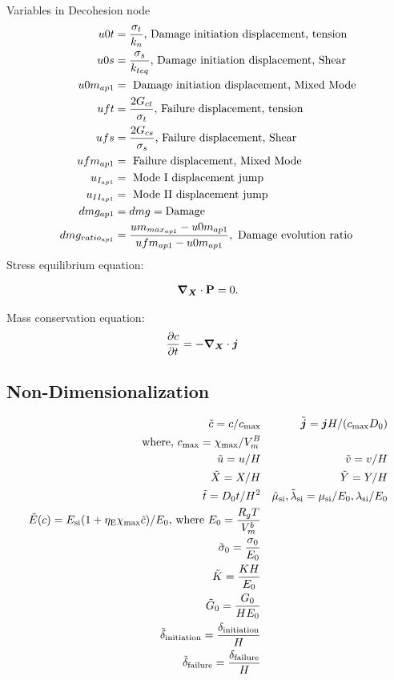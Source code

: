 \documentclass[../main.tex]{subfiles}
\begin{document}
Variables in Decohesion node
\begin{align}
    u0t &= \frac{\sigma_t}{k_n} \text{, Damage initiation displacement, tension} \\
    u0s &= \frac{\sigma_s}{k_{teq}} \text{, Damage initiation displacement, Shear}\\
    u0m_{ap1} &= \text{ Damage initiation displacement, Mixed Mode}\\
    uft &= \frac{2 G_{ct}}{\sigma_t} \text{, Failure displacement, tension} \\
    ufs &= \frac{2 G_{cs}}{\sigma_s} \text{, Failure displacement, Shear}\\
    ufm_{ap1} &= \text{ Failure displacement, Mixed Mode}\\
    u_{I_{ap1}} &= \text{ Mode I displacement jump}\\
    u_{II_{ap1}} &= \text{ Mode II displacement jump}\\
    dmg_{ap1} &= dmg = \text{Damage}\\
    dmg_{ratio_{ap1}} &= \frac{um_{max_{ap1}} - u0m_{ap1}}{ufm_{ap1}-u0m_{ap1}}, \text{ Damage evolution ratio}
\end{align}
Stress equilibrium equation:

\begin{gather}
\bm{\nabla}_{\bm{X}} \cdot \mathbf{P} = 0.
\end{gather}

Mass conservation equation:
\begin{align}
    \frac{\partial c}{\partial t} &= - \bm{\nabla}_{\bm{X}} \cdot \bm{j}
\end{align}

\subsection{Non-Dimensionalization}
\begin{align*}
    \tilde{c} = c/c_{\rm{max}} && \tilde{\bm{j}} = \bm{j} H/({c_{\rm{max}}} D_0) \\ \text{where, } {c_{\rm{max}}} = \chi_{\rm max}/V_m^B \\
    \tilde{u} = u/H && \tilde{v} = v/H \\
    \tilde{X} = X/H && \tilde{Y} = Y/H \\
    \tilde{t} = D_0 t/H^2 && \tilde{\mu}_{\text{si}}, \tilde{\lambda}_{\text{si}} = \mu_{\text{si}}/E_0, \lambda_{\text{si}}/E_0 \\
    \tilde{E}(c) = E_{\text{si}}(1 + \eta_{\rm{E}} \chi_{\rm{max}} \tilde{c})/E_0 \text{, where }  E_0 = \frac{R_g T}{V_m^b} \\
    \tilde{\sigma}_{0} = \frac{\sigma_0}{E_0}\\
    \tilde{K} = \frac{K H}{E_0} \\
    \tilde{G}_0 = \frac{G_0}{H E_0} \\
    \tilde{\delta}_{\text{initiation}} = \frac{\delta_{\text{initiation}}}{H}\\
    \tilde{\delta}_{\text{failure}} = \frac{\delta_{\text{failure}}}{H}
\end{align*}
\end{document}
